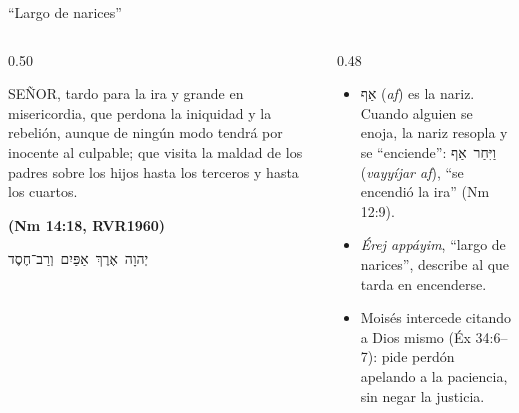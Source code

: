 \documentclass[hyperref={bookmarks=false},aspectratio=169]{beamer}
\newcommand{\heb}[1]{\mbox{\foreignlanguage{hebrew}{#1}}}
\newcommand{\SENOR}{S{\fontsize{0.78em}{1em}\selectfont EÑOR}}
\newcommand{\fuente}[1]{\par\hfill{\upshape\bfseries\footnotesize\textcolor{azul}{#1}}}
\begin{document}
\begin{frame}{``Largo de narices''}
\begin{columns}[t,onlytextwidth]
\begin{column}{0.50\textwidth}
\begin{cita}\SENOR, tardo para la ira y grande en misericordia, que perdona la iniquidad y la rebelión, aunque de ningún modo tendrá por inocente al culpable; que visita la maldad de los padres sobre los hijos hasta los terceros y hasta los cuartos.\fuente{(Nm 14:18, RVR1960)}\end{cita}
\begin{center}\heb{יְהוָה אֶרֶךְ אַפַּיִם וְרַב־חֶסֶד}\end{center}
\end{column}
\begin{column}{0.48\textwidth}\small
\begin{itemize}
\item \heb{אַף} (\emph{af}) es la nariz. Cuando alguien se enoja, la nariz resopla y se ``enciende'': \heb{וַיִּחַר אַף} (\emph{vayyíjar af}), ``se encendió la ira'' (Nm 12:9).
\item \emph{Érej appáyim}, ``largo de narices'', describe al que tarda en encenderse.
\item Moisés intercede citando a Dios mismo (Éx 34:6--7): pide perdón apelando a la paciencia, sin negar la justicia.
\end{itemize}
\end{column}
\end{columns}
\end{frame}
\end{document}
